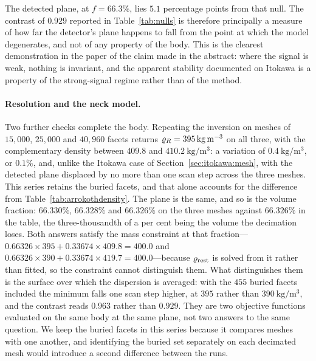 The detected plane, at $f = 66.3\%$, lies $5.1$ percentage points from
that null. The contrast of $0.929$ reported in Table~\ref{tab:nulls} is
therefore principally a measure of how far the detector's plane happens
to fall from the point at which the model degenerates, and not of any
property of the body. This is the clearest demonstration in the paper of
the claim made in the abstract: where the signal is weak, nothing is
invariant, and the apparent stability documented on Itokawa is a
property of the strong-signal regime rather than of the method.

\paragraph{Resolution and the neck model.}
Two further checks complete the body. Repeating the inversion on meshes
of $15{,}000$, $25{,}000$ and $40{,}960$ facets returns
$\varrho_{R} = \SI{395}{\kilo\gram\per\cubic\metre}$ on all three, with the
complementary density between $409.8$ and
$\SI{410.2}{\kilo\gram\per\cubic\metre}$: a variation of
$\SI{0.4}{\kilo\gram\per\cubic\metre}$, or $0.1\%$, and, unlike the
Itokawa case of Section~\ref{sec:itokawa:mesh}, with the detected plane
displaced by no more than one scan step across the three meshes.
This series retains the buried facets, and that alone accounts for the
difference from Table~\ref{tab:arrokothdensity}. The plane is the same, and
so is the volume fraction: $66.330\%$, $66.328\%$ and $66.326\%$ on the three
meshes against $66.326\%$ in the table, the three-thousandth of a per cent
being the volume the decimation loses. Both answers satisfy the mass
constraint at that fraction---$0.66326\times395 + 0.33674\times409.8 = 400.0$
and $0.66326\times390 + 0.33674\times419.7 = 400.0$---because $\varrho_{\mathrm{rest}}$ is
solved from it rather than fitted, so the constraint cannot distinguish them.
What distinguishes them is the surface over which the dispersion is averaged:
with the $455$ buried facets included the minimum falls one scan step higher,
at $395$ rather than $\SI{390}{\kilo\gram\per\cubic\metre}$, and the contrast
reads $0.963$ rather than $0.929$. They are two objective functions evaluated
on the same body at the same plane, not two answers to the same question. We
keep the buried facets in this series because it compares meshes with one
another, and identifying the buried set separately on each decimated mesh
would introduce a second difference between the runs.

